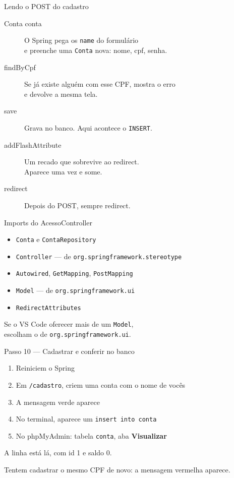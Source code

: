 \documentclass[aspectratio=169,11pt]{beamer}
\begin{document}
\begin{frame}{Lendo o POST do cadastro}
  \begin{description}
    \item[Conta conta] O Spring pega os \texttt{name} do formulário\\
      e preenche uma \texttt{Conta} nova: nome, cpf, senha.
    \item[findByCpf] Se já existe alguém com esse CPF, mostra o erro\\
      e devolve a mesma tela.
    \item[save] Grava no banco. Aqui acontece o \texttt{INSERT}.
    \item[addFlashAttribute] Um recado que sobrevive ao redirect.\\
      Aparece uma vez e some.
    \item[redirect] Depois do POST, sempre redirect.
  \end{description}
\end{frame}

\begin{frame}{Imports do AcessoController}
  \begin{itemize}
    \item \texttt{Conta} e \texttt{ContaRepository}
    \item \texttt{Controller} --- de \texttt{org.springframework.stereotype}
    \item \texttt{Autowired}, \texttt{GetMapping}, \texttt{PostMapping}
    \item \texttt{Model} --- de \texttt{org.springframework.ui}
    \item \texttt{RedirectAttributes}
  \end{itemize}

  \vspace{0.5em}
  Se o VS Code oferecer mais de um \texttt{Model},\\
  escolham o de \texttt{org.springframework.ui}.
\end{frame}

\begin{frame}{Passo 10 --- Cadastrar e conferir no banco}
  \begin{enumerate}
    \item Reiniciem o Spring
    \item Em \texttt{/cadastro}, criem uma conta com o nome de vocês
    \item A mensagem verde aparece
    \item No terminal, aparece um \texttt{insert into conta}
    \item No phpMyAdmin: tabela \texttt{conta}, aba \textbf{Visualizar}
  \end{enumerate}

  \vspace{0.5em}
  A linha está lá, com id 1 e saldo 0.

  \vspace{0.3em}
  Tentem cadastrar o mesmo CPF de novo: a mensagem vermelha aparece.
\end{frame}
\end{document}

